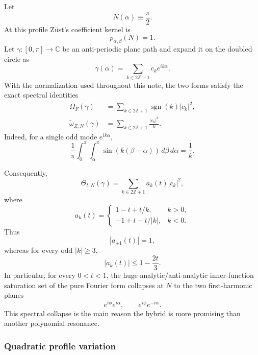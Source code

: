 \documentclass[11pt]{article}
\newcommand{\C}{\mathbb C}
\newcommand{\Z}{\mathbb Z}
\begin{document}
Let
\[
        N(\alpha)\equiv\frac{\pi}{2}.
\]
At this profile Z\"ust's coefficient kernel is
\[
        p_{\alpha,\beta}(N)=1.
\]
Let $\gamma:[0,\pi]\to\C$ be an anti-periodic plane path and expand it on
the doubled circle as
\[
        \gamma(\alpha)
        =\sum_{k\in2\Z+1}c_ke^{ik\alpha}.
\]
With the normalization used throughout this note, the two forms satisfy
the exact spectral identities
\begin{align}
 \Omega_F(\gamma)
 &=
 \sum_{k\in2\Z+1}
 \operatorname{sgn}(k)|c_k|^2,
 \label{eq:hybrid-F-diag}\\
 \widetilde\omega_{Z,N}(\gamma)
 &=
 \sum_{k\in2\Z+1}
 \frac{|c_k|^2}{k}.
 \label{eq:hybrid-Z-diag}
\end{align}
Indeed, for a single odd mode $e^{ik\alpha}$,
\[
 \frac1\pi
 \int_0^\pi\int_\alpha^\pi
 \sin(k(\beta-\alpha))\,d\beta\,d\alpha
 =\frac1k.
\]

Consequently,
\begin{equation}\label{eq:hybrid-diag}
 \Theta_{t,N}(\gamma)
 =
 \sum_{k\in2\Z+1}a_k(t)|c_k|^2,
\end{equation}
where
\[
 a_k(t)=
 \begin{cases}
 1-t+t/k,&k>0,\\[1mm]
 -1+t-t/|k|,&k<0.
 \end{cases}
\]
Thus
\[
        |a_{\pm1}(t)|=1,
\]
whereas for every odd $|k|\ge3$,
\begin{equation}\label{eq:hybrid-spectral-gap}
        |a_k(t)|
        \le1-\frac{2t}{3}.
\end{equation}
In particular, for every $0<t<1$, the huge analytic/anti-analytic
inner-function saturation set of the pure Fourier form collapses at $N$ to
the two first-harmonic planes
\[
        e^{i\phi}e^{i\alpha},
        \qquad
        e^{i\phi}e^{-i\alpha}.
\]
This spectral collapse is the main reason the hybrid is more promising
than another polynomial resonance.

\subsubsection{Quadratic profile variation}
\end{document}
